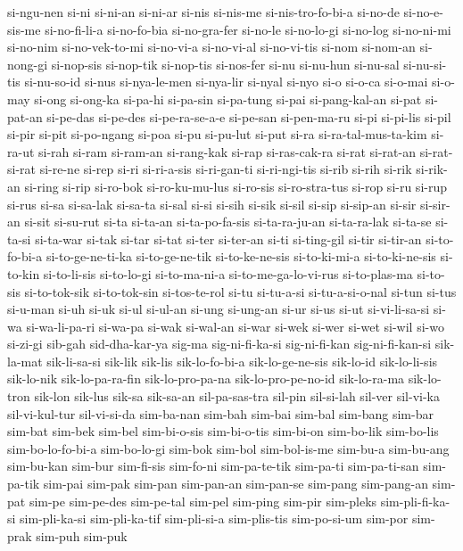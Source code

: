 {si-ngu-nen si-ni si-ni-an si-ni-ar si-nis si-nis-me si-nis-tro-fo-bi-a
si-no-de si-no-e-sis-me si-no-fi-li-a si-no-fo-bia si-no-gra-fer si-no-le
si-no-lo-gi si-no-log si-no-ni-mi si-no-nim si-no-vek-to-mi si-no-vi-a
si-no-vi-al si-no-vi-tis si-nom si-nom-an si-nong-gi si-nop-sis si-nop-tik
si-nop-tis si-nos-fer si-nu si-nu-hun si-nu-sal si-nu-si-tis si-nu-so-id
si-nus si-nya-le-men si-nya-lir si-nyal si-nyo si-o si-o-ca si-o-mai
si-o-may si-ong si-ong-ka si-pa-hi si-pa-sin si-pa-tung si-pai
si-pang-kal-an si-pat si-pat-an si-pe-das si-pe-des si-pe-ra-se-a-e
si-pe-san si-pen-ma-ru si-pi si-pi-lis si-pil si-pir si-pit si-po-ngang
si-poa si-pu si-pu-lut si-put si-ra si-ra-tal-mus-ta-kim si-ra-ut si-rah
si-ram si-ram-an si-rang-kak si-rap si-ras-cak-ra si-rat si-rat-an
si-rat-si-rat si-re-ne si-rep si-ri si-ri-a-sis si-ri-gan-ti si-ri-ngi-tis
si-rib si-rih si-rik si-rik-an si-ring si-rip si-ro-bok si-ro-ku-mu-lus
si-ro-sis si-ro-stra-tus si-rop si-ru si-rup si-rus si-sa si-sa-lak
si-sa-ta si-sal si-si si-sih si-sik si-sil si-sip si-sip-an si-sir
si-sir-an si-sit si-su-rut si-ta si-ta-an si-ta-po-fa-sis si-ta-ra-ju-an
si-ta-ra-lak si-ta-se si-ta-si si-ta-war si-tak si-tar si-tat si-ter
si-ter-an si-ti si-ting-gil si-tir si-tir-an si-to-fo-bi-a
si-to-ge-ne-ti-ka si-to-ge-ne-tik si-to-ke-ne-sis si-to-ki-mi-a
si-to-ki-ne-sis si-to-kin si-to-li-sis si-to-lo-gi si-to-ma-ni-a
si-to-me-ga-lo-vi-rus si-to-plas-ma si-to-sis si-to-tok-sik si-to-tok-sin
si-tos-te-rol si-tu si-tu-a-si si-tu-a-si-o-nal si-tun si-tus si-u-man
si-uh si-uk si-ul si-ul-an si-ung si-ung-an si-ur si-us si-ut
si-vi-li-sa-si si-wa si-wa-li-pa-ri si-wa-pa si-wak si-wal-an si-war
si-wek si-wer si-wet si-wil si-wo si-zi-gi sib-gah sid-dha-kar-ya sig-ma
sig-ni-fi-ka-si sig-ni-fi-kan sig-ni-fi-kan-si sik-la-mat sik-li-sa-si
sik-lik sik-lis sik-lo-fo-bi-a sik-lo-ge-ne-sis sik-lo-id sik-lo-li-sis
sik-lo-nik sik-lo-pa-ra-fin sik-lo-pro-pa-na sik-lo-pro-pe-no-id
sik-lo-ra-ma sik-lo-tron sik-lon sik-lus sik-sa sik-sa-an sil-pa-sas-tra
sil-pin sil-si-lah sil-ver sil-vi-ka sil-vi-kul-tur sil-vi-si-da
sim-ba-nan sim-bah sim-bai sim-bal sim-bang sim-bar sim-bat sim-bek
sim-bel sim-bi-o-sis sim-bi-o-tis sim-bi-on sim-bo-lik sim-bo-lis
sim-bo-lo-fo-bi-a sim-bo-lo-gi sim-bok sim-bol sim-bol-is-me sim-bu-a
sim-bu-ang sim-bu-kan sim-bur sim-fi-sis sim-fo-ni sim-pa-te-tik sim-pa-ti
sim-pa-ti-san sim-pa-tik sim-pai sim-pak sim-pan sim-pan-an sim-pan-se
sim-pang sim-pang-an sim-pat sim-pe sim-pe-des sim-pe-tal sim-pel sim-ping
sim-pir sim-pleks sim-pli-fi-ka-si sim-pli-ka-si sim-pli-ka-tif
sim-pli-si-a sim-plis-tis sim-po-si-um sim-por sim-prak sim-puh sim-puk
}
